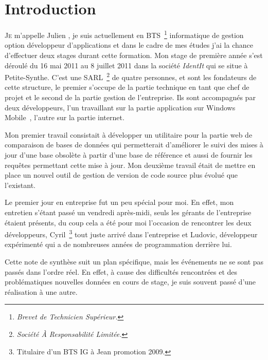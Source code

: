 \chapter{Introduction} %
\label{cha:Introduction}

\lettrine{J}{e} m'appelle Julien , je suis actuellement en
BTS\, \footnote{\emph{Brevet de Technicien Supérieur.}} informatique de
gestion option développeur d'applications et dans le cadre de mes études
j'ai la chance d'effectuer deux stages durant cette formation. Mon stage
de première année s'est déroulé du 16 mai 2011 au 8 juillet 2011 dans la
société \emph{IdentIt} qui se situe à Petite-Synthe. C'est une SARL\,
\footnote{\emph{Société À Responsabilité Limitée.}} de quatre personnes,
 et  sont les fondateurs de cette
structure, le premier s'occupe de la partie technique en tant que chef
de projet et le second de la partie gestion de l'entreprise. Ils sont
accompagnés par deux développeurs, l'un travaillant sur la partie
application sur Windows Mobile~\textregistered, l'autre sur la partie
internet.

Mon premier travail consistait à développer un utilitaire pour la partie
web de comparaison de bases de données qui permetterait d'améliorer le
suivi des mises à jour d'une base obsolète à partir d'une base de
référence et aussi de fournir les requêtes permettant cette mise à jour.
Mon deuxième travail était de mettre en place un nouvel outil de gestion
de version de code source plus évolué que l'existant.

Le premier jour en entreprise fut un peu spécial pour moi. En effet, mon
entretien s'étant passé un vendredi après-midi, seuls les gérants de
l'entreprise étaient présents, du coup cela a été pour moi l'occasion de
rencontrer les deux développeurs, Cyril\, \footnote{Titulaire d'un BTS
IG à Jean  promotion 2009.} tout juste arrivé dans
l'entreprise et Ludovic, développeur expérimenté qui a de nombreuses
années de programmation derrière lui.

Cette note de synthèse suit un plan spécifique, mais les événements ne
se sont pas passés dans l'ordre réel. En effet, à cause des difficultés
rencontrées et des problématiques nouvelles données en cours de stage,
je suis souvent passé d'une réalisation à une autre.
